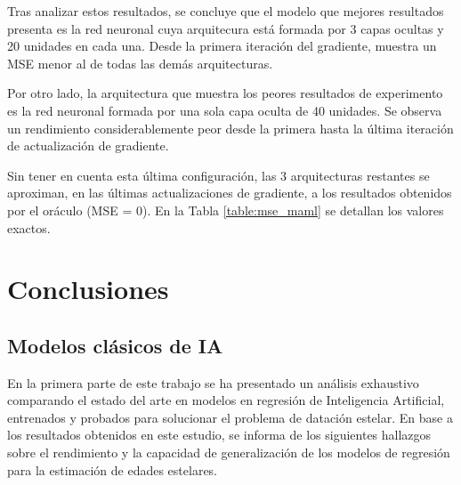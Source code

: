 Tras analizar estos resultados, se concluye que el modelo que mejores resultados presenta es la red neuronal cuya arquitecura está formada por 3 capas ocultas y 20 unidades en cada una. Desde la primera iteración del gradiente, muestra un MSE menor al de todas las demás arquitecturas.

Por otro lado, la arquitectura que muestra los peores resultados de experimento es la red neuronal formada por una sola capa oculta de 40 unidades. Se observa un rendimiento considerablemente peor desde la primera hasta la última iteración de actualización de gradiente.

Sin tener en cuenta esta última configuración, las 3 arquitecturas restantes se aproximan, en las últimas actualizaciones de gradiente, a los resultados obtenidos por el oráculo (MSE = 0). En la Tabla \ref{table:mse_maml} se detallan los valores exactos.

\begin{table}[H]
\centering
{}%
\caption{MSE para las diferentes arquitucturas y cada una de las actualizaciones de gradiente.}\label{table:mse_maml}
\end{table}


\chapter{Conclusiones}

\section{Modelos clásicos de IA}

En la primera parte de este trabajo se ha presentado un análisis exhaustivo comparando el estado del arte en modelos en regresión de Inteligencia Artificial, entrenados y probados para solucionar el problema de datación estelar. En base a los resultados obtenidos en este estudio, se informa de los siguientes hallazgos sobre el rendimiento y la capacidad de generalización de los modelos de regresión para la estimación de edades estelares.

